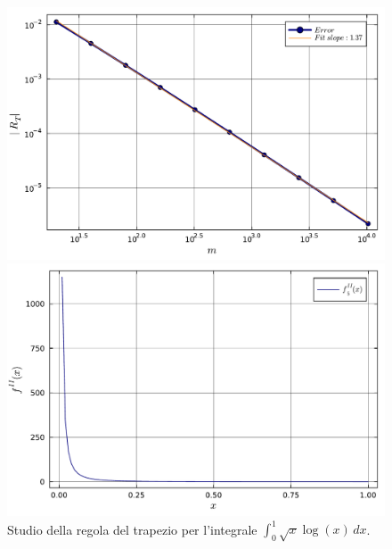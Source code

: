 \documentclass[letterpaper, 12pt]{article}
\numberwithin{equation}{section}    %
\begin{document}
\begin{figure}[!ht]
    \centering
    \begin{minipage}[b]{0.47\textwidth}
        \includegraphics[width=\textwidth]{5125.pdf}
    \end{minipage}
    \hspace{0.5cm}
    \begin{minipage}[b]{0.47\textwidth}
        \includegraphics[width=\textwidth]{5125_2.pdf}
    \end{minipage}
    \caption{Studio della regola del trapezio per l'integrale $\int_0^1 \sqrt{x} \log(x) \, dx$.}
    \label{fig:es5_1_2_5}
\end{figure}
\end{document}

